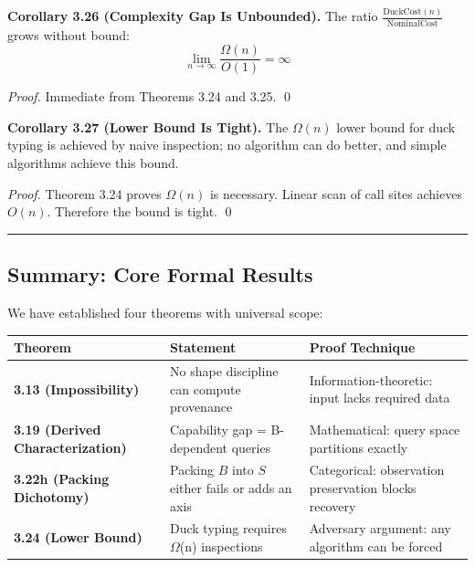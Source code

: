 \textbf{Corollary 3.26 (Complexity Gap Is Unbounded).} The ratio
\(\frac{\text{DuckCost}(n)}{\text{NominalCost}}\) grows without bound:
\[\lim_{n \to \infty} \frac{\Omega(n)}{O(1)} = \infty\]

\emph{Proof.} Immediate from Theorems 3.24 and 3.25. \qed

\textbf{Corollary 3.27 (Lower Bound Is Tight).} The $\Omega(n)$ lower bound for
duck typing is achieved by naive inspection; no algorithm can do
better, and simple algorithms achieve this bound.

\emph{Proof.} Theorem 3.24 proves \(\Omega(n)\) is necessary. Linear
scan of call sites achieves \(O(n)\). Therefore the bound is tight.
\qed

\begin{center}\rule{0.5\linewidth}{0.5pt}\end{center}

\subsection{Summary: Core Formal
Results}\label{summary-core-formal-results}

We have established four theorems with universal scope:

\small
\begin{longtable}[]{@{}
  >{\raggedright\arraybackslash}p{}
  >{\raggedright\arraybackslash}p{}
  >{\raggedright\arraybackslash}p{}@{}}
\toprule\noalign{}
\begin{minipage}[b]{\linewidth}\raggedright
Theorem
\end{minipage} & \begin{minipage}[b]{\linewidth}\raggedright
Statement
\end{minipage} & \begin{minipage}[b]{\linewidth}\raggedright
Proof Technique
\end{minipage} \\
\midrule\noalign{}
\endhead
\bottomrule\noalign{}
\endlastfoot
\textbf{3.13 (Impossibility)} & No shape discipline can compute
provenance & Information-theoretic: input lacks required data \\
\textbf{3.19 (Derived Characterization)} & Capability gap = B-dependent
queries & Mathematical: query space partitions exactly \\
\textbf{3.22h (Packing Dichotomy)} & Packing $B$ into $S$ either fails or adds an axis &
Categorical: observation preservation blocks recovery \\
\textbf{3.24 (Lower Bound)} & Duck typing requires $\Omega$(n) inspections &
Adversary argument: any algorithm can be forced \\
\end{longtable}

